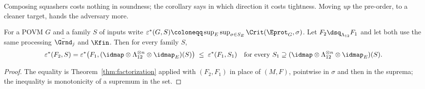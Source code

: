 
Composing squashers costs nothing in soundness; the corollary says in which
direction it costs tightness. Moving \emph{up} the pre-order, to a cleaner
target, hands the adversary more.

\begin{corollary}\label{cor:monotone}
For a POVM $G$ and a family $S$ of inputs write
$\varepsilon^{*}(G,S)\coloneqq\sup_E\sup_{\sigma\in S_E}
\Crit(\Eprot_G,\sigma)$. Let $F_2\dsq_{\Lambda_{12}}F_1$ and let both
 use the same processing $\bar{\Grnd}_j$ and $\Kfin$. Then for
every family $S$,
\begin{equation*}
  \varepsilon^{*}(F_2,S)
  =\varepsilon^{*}\big(F_1,(\idmap\otimes\Lambda_{12}^{\otimes n}\otimes\idmap_E)(S)\big)
  \;\le\;\varepsilon^{*}(F_1,S_1)
  \quad\text{for every }S_1\supseteq
  (\idmap\otimes\Lambda_{12}^{\otimes n}\otimes\idmap_E)(S).
\end{equation*}
\end{corollary}

\begin{proof}
The equality is Theorem~\ref{thm:factorization} applied with $(F_2,F_1)$ in
place of $(M,F)$, pointwise in $\sigma$ and then in the suprema; the inequality
is monotonicity of a supremum in the set.
\end{proof}
